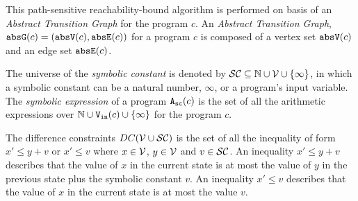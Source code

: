 This path-sensitive reachability-bound algorithm
is performed on basis of an \emph{Abstract Transition Graph} for the program $c$.
An \emph{Abstract Transition Graph}, $\mathtt{abs}{\mathtt{G}}(c) =(\mathtt{abs}{\mathtt{V}}(c), \mathtt{abs}{\mathtt{E}}(c))$ for a program $c$ is composed of
a vertex set $\mathtt{abs}{\mathtt{V}}(c)$ and an edge set $\mathtt{abs}{\mathtt{E}}(c)$.
%
%

\begin{defn}
  \label{def:symbolic_expr}
The universe of the \emph{symbolic constant} is denoted by $\mathcal{SC} \subseteq \mathbb{N} \cup \mathcal{V} \cup \{\infty \}$, in which a symbolic constant can be a natural number, $\infty$, or a program's input variable.
 The \emph{symbolic expression} of a program ${\mathtt{A_{sc}}}(c)$ is the set of all the arithmetic expressions over $\mathbb{N} \cup {\ensuremath{\mathtt{V_{\mathtt{in}}}}}(c) \cup \{\infty \}$ for the program $c$.
\end{defn}

\begin{defn}
 The difference constraints $DC(\mathcal{V}  \cup \mathcal{SC})$ is the set of all the inequality of
form $x' \leq y + v$ or $x' \leq v$ where $x \in \mathcal{V} $, 
$y \in \mathcal{V}$ and $v \in \mathcal{SC}$.
An inequality $x' \leq y + v$ describes that the value of $x$ in the current state is
at most the value of $y$ in the previous state plus the symbolic constant $v$.
An inequality $x' \leq v$ describes that the value of $x$ in the current state is
at most the value $v$.
\end{defn}


